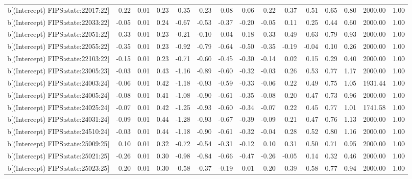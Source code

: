 \begin{table}[ht]
\begin{tabular}{rrrrrrrrrrrrrrr}
  b[(Intercept) FIPS:state:22017:22] & 0.22 & 0.01 & 0.23 & -0.35 & -0.23 & -0.08 & 0.06 & 0.22 & 0.37 & 0.51 & 0.65 & 0.80 & 2000.00 & 1.00 \\ 
  b[(Intercept) FIPS:state:22033:22] & -0.05 & 0.01 & 0.24 & -0.67 & -0.53 & -0.37 & -0.20 & -0.05 & 0.11 & 0.25 & 0.44 & 0.60 & 2000.00 & 1.00 \\ 
  b[(Intercept) FIPS:state:22051:22] & 0.33 & 0.01 & 0.23 & -0.21 & -0.10 & 0.04 & 0.18 & 0.33 & 0.49 & 0.63 & 0.79 & 0.93 & 2000.00 & 1.00 \\ 
  b[(Intercept) FIPS:state:22055:22] & -0.35 & 0.01 & 0.23 & -0.92 & -0.79 & -0.64 & -0.50 & -0.35 & -0.19 & -0.04 & 0.10 & 0.26 & 2000.00 & 1.00 \\ 
  b[(Intercept) FIPS:state:22103:22] & -0.15 & 0.01 & 0.23 & -0.71 & -0.60 & -0.45 & -0.30 & -0.14 & 0.02 & 0.15 & 0.29 & 0.40 & 2000.00 & 1.00 \\ 
  b[(Intercept) FIPS:state:23005:23] & -0.03 & 0.01 & 0.43 & -1.16 & -0.89 & -0.60 & -0.32 & -0.03 & 0.26 & 0.53 & 0.77 & 1.17 & 2000.00 & 1.00 \\ 
  b[(Intercept) FIPS:state:24003:24] & -0.06 & 0.01 & 0.42 & -1.18 & -0.93 & -0.59 & -0.33 & -0.06 & 0.22 & 0.49 & 0.75 & 1.05 & 1931.44 & 1.00 \\ 
  b[(Intercept) FIPS:state:24005:24] & -0.08 & 0.01 & 0.41 & -1.08 & -0.90 & -0.61 & -0.35 & -0.08 & 0.20 & 0.47 & 0.73 & 0.96 & 2000.00 & 1.00 \\ 
  b[(Intercept) FIPS:state:24025:24] & -0.07 & 0.01 & 0.42 & -1.25 & -0.93 & -0.60 & -0.34 & -0.07 & 0.22 & 0.45 & 0.77 & 1.01 & 1741.58 & 1.00 \\ 
  b[(Intercept) FIPS:state:24031:24] & -0.09 & 0.01 & 0.44 & -1.28 & -0.93 & -0.67 & -0.39 & -0.09 & 0.21 & 0.47 & 0.76 & 1.13 & 2000.00 & 1.00 \\ 
  b[(Intercept) FIPS:state:24510:24] & -0.03 & 0.01 & 0.44 & -1.18 & -0.90 & -0.61 & -0.32 & -0.04 & 0.28 & 0.52 & 0.80 & 1.16 & 2000.00 & 1.00 \\ 
  b[(Intercept) FIPS:state:25009:25] & 0.10 & 0.01 & 0.32 & -0.72 & -0.54 & -0.31 & -0.12 & 0.10 & 0.31 & 0.50 & 0.71 & 0.95 & 2000.00 & 1.00 \\ 
  b[(Intercept) FIPS:state:25021:25] & -0.26 & 0.01 & 0.30 & -0.98 & -0.84 & -0.66 & -0.47 & -0.26 & -0.05 & 0.14 & 0.32 & 0.46 & 2000.00 & 1.00 \\ 
  b[(Intercept) FIPS:state:25023:25] & 0.20 & 0.01 & 0.30 & -0.58 & -0.37 & -0.19 & 0.01 & 0.20 & 0.39 & 0.58 & 0.77 & 0.94 & 2000.00 & 1.00 \\ 

\end{tabular}
\end{table}
